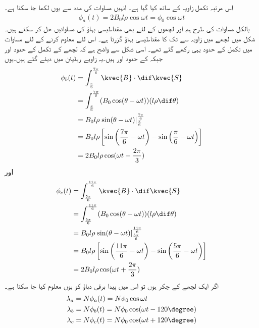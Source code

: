 اس مرتبہ تکمل زاویہ  کے ساتھ کیا گیا ہے۔ انہیں مساوات  کی مدد سے یوں لکھا جا سکتا ہے۔
\begin{align}
\phi_a(t)=2 B_0 l \rho \cos \omega t=\phi_0 \cos \omega t
\end{align}
بالکل مساوات  کی طرح ہم   اور  لچھوں کے لئے  بھی مقناطیسی بہاؤ کی مساواتیں حل کر سکتے ہیں۔شکل   میں  لچھے میں زاویہ  سے   تک کا مقناطیسی بہاؤ گزرتا ہے۔ اس لئے   معلوم کرنے کے لئے مساوات  میں تکمل کے حدود یہی رکھے گئے تھے۔ اسی شکل سے واضح ہے کہ  لچھے کے تکمل کے حدود 
  اور  جبکہ  کے حدود  اور  ہیں۔یہ زاویے ریڈیئن میں دیئے گئے ہیں۔یوں
\begin{gather}
\begin{aligned}
\phi_b(t)&=\int_{\frac{\pi}{6}}^{\frac{7\pi}{6}} \kvec{B} \cdot \dif \kvec{S}\\
&=\int_{\frac{\pi}{6}}^{\frac{7\pi}{6}} (B_0 \cos (\theta-\omega t))(l \rho \dif \theta)\\
&=B_0 l \rho \left. \sin (\theta-\omega t) \right|_{\frac{\pi}{6}}^{\frac{7\pi}{6}}\\
&=B_0 l \rho \left[\sin \left(\frac{7\pi}{6}-\omega t \right )-\sin \left (\frac{\pi}{6}-\omega t \right) \right]\\
&=2 B_0 l \rho \cos (\omega t-\frac{2\pi}{3})
\end{aligned}
\end{gather}
اور
\begin{gather}
\begin{aligned}
\phi_c(t)&=\int_{\frac{5\pi}{6}}^{\frac{11\pi}{6}} \kvec{B} \cdot \dif \kvec{S}\\
&=\int_{\frac{5\pi}{6}}^{\frac{11\pi}{6}} (B_0 \cos (\theta-\omega t))(l \rho \dif \theta)\\
&=B_0 l \rho \left. \sin (\theta-\omega t) \right|_{\frac{5\pi}{6}}^{\frac{11\pi}{6}}\\
&=B_0 l \rho \left[\sin \left(\frac{11\pi}{6}-\omega t \right )-\sin \left (\frac{5\pi}{6}-\omega t \right) \right]\\
&=2 B_0 l \rho \cos (\omega t+\frac{2\pi}{3})
\end{aligned}
\end{gather}
اگر ایک لچھے کے  چکر ہوں تو اس میں پیدا برقی دباؤ کو یوں معلوم کیا جا سکتا ہے۔
\begin{gather}
\begin{aligned}
\lambda_a&=N \phi_a (t)=N \phi_0 \cos \omega t\\
\lambda_b&=N \phi_b (t)=N \phi_0 \cos (\omega t-120\degree)\\
\lambda_c&=N \phi_c (t)=N \phi_0 \cos (\omega t+120\degree)
\end{aligned}
\end{gather}
